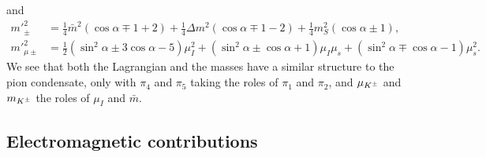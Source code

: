 \endgroup
%
and
%
\begingroup
\allowdisplaybreaks
\begin{align}
    {m'}_\pm^2
    & =
    \frac{1}{4}\bar m^2 (\cos\alpha \mp 1 + 2)
    + \frac{1}{4} \Delta m^2 (\cos\alpha \mp 1-2)
    +\frac{1}{4} m_S^2 (\cos\alpha \pm 1), \\
    {m'}_{\mu\pm}^2
    & =
    \frac{1}{2}(\sin^2\alpha  \pm 3\cos\alpha - 5)\mu_I^2
    +(\sin^2\alpha\pm\cos\alpha + 1)\mu_I\mu_s
    +(\sin^2\alpha\mp\cos\alpha - 1)\mu_s^2.
\end{align}
\endgroup
%
We see that both the Lagrangian and the masses have a similar structure to the pion condensate, only with $\pi_4$ and $\pi_5$ taking the roles of $\pi_1$ and $\pi_2$, and $\mu_{K^\pm}$ and $m_{K^\pm}$ the roles of $\mu_I$ and $\bar m$.


 
\subsection{Electromagnetic contributions}

